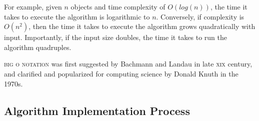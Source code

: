 \documentclass[a4paper]{article}
\begin{document}
\begin{description}
        For example, given $n$ objects and time complexity of $O(log(n))$, the
        time it takes to execute the algorithm is logarithmic to $n$.
        Conversely, if complexity is $O(n^2)$, then the time it takes to
        execute the algorithm grows quadratically with input. Importantly, if
        the input size doubles, the time it takes to run the algorithm
        quadruples.

        \textsc{big o notation} was first suggested by
        Bachmann\cite{bachmann1894analytische} and Landau\cite{landau1911} in
        late \textsc{xix} century, and clarified and popularized for computing
        science by Donald Knuth\cite{knuth1976big} in the 1970s.

\end{description}

\subsection{Algorithm Implementation Process}
\label{sec:algorithm-implementation-process}

\end{document}
